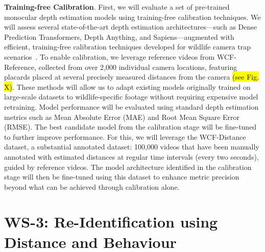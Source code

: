 \documentclass{article}
\begin{document}
\textbf{Training-free Calibration}. First, we will evaluate a set of pre-trained monocular depth estimation models using training-free calibration techniques. We will assess several state-of-the-art depth estimation architectures—such as Dense Prediction Transformers, Depth Anything, and Sapiens—augmented with efficient, training-free calibration techniques developed for wildlife camera trap scenarios~\cite{}. To enable calibration, we leverage reference videos from WCF-Reference, collected from over 2,000 individual camera locations, featuring placards placed at several precisely measured distances from the camera \hl{(see Fig. X)}. These methods will allow us to adapt existing models originally trained on large-scale datasets to wildlife-specific footage without requiring expensive model retraining. Model performance will be evaluated using standard depth estimation metrics such as Mean Absolute Error (MAE) and Root Mean Square Error (RMSE). The best candidate model from the calibration stage will be fine-tuned to further improve performance. For this, we will leverage the WCF-Distance dataset, a substantial annotated dataset: 100,000 videos that have been manually annotated with estimated distances at regular time intervals (every two seconds), guided by reference videos. The model architecture identified in the calibration stage will then be fine-tuned using this dataset to enhance metric precision beyond what can be achieved through calibration alone.

\section*{WS-3: Re-Identification using Distance and Behaviour}


\end{document}
